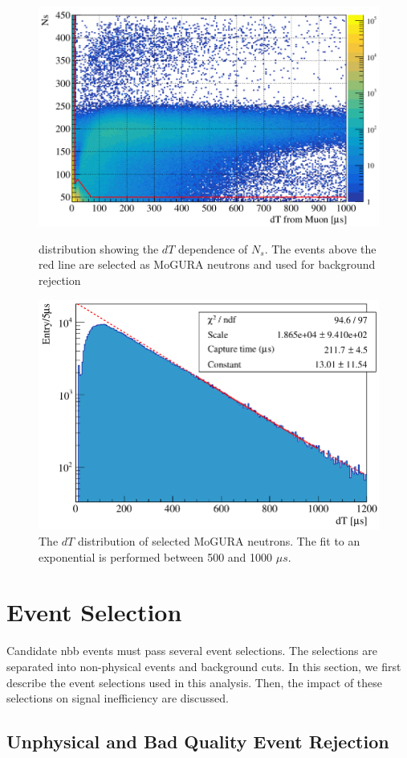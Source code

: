 \begin{figure}[htb]
    \begin{minipage}{0.5\textwidth}
        \centering
        \includegraphics[scale=0.3]{mog_neutron.png}
        \caption{distribution showing the $dT$ dependence of $N_s$. The events above the red line are selected as MoGURA neutrons and used for background rejection \cite{takeuchi_phd}}
        \label{fig:neutron_selection}
    \end{minipage}
    \hfill
    \begin{minipage}{0.5\textwidth}
        \centering
        \includegraphics[scale=0.3]{mog_neutron_dt.png}
        \caption{The $dT$ distribution of selected MoGURA neutrons. The fit to an exponential is performed between 500 and 1000 $\mu s$. \cite{takeuchi_phd}}
        \label{fig:neutron_dT}
    \end{minipage}
\end{figure}

\section{Event Selection}
Candidate \0nbb events must pass several event selections. The selections are separated into non-physical events and background cuts. In this section, we first describe the event selections used in this analysis. Then, the impact of these selections on signal inefficiency are discussed.

\subsection{Unphysical and Bad Quality Event Rejection}
